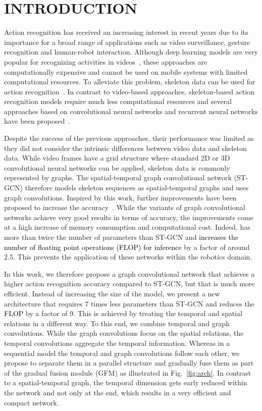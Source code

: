 \documentclass[letterpaper, 10 pt, conference]{ieeeconf}
\newcommand{\todo}[1]{{\textcolor{black}{#1}}}
\begin{document}
\section{INTRODUCTION}
Action recognition has received an increasing interest in recent years due to its importance for a broad range of applications such as video surveillance, gesture recognition and human-robot interaction. Although deep learning models are very popular for recognizing activities in videos~\cite{simonyan2014two, carreira2017quo,li2020ms}, these approaches are computationally expensive and cannot be used on mobile systems with limited computational resources. To alleviate this problem, skeleton data can be used for action recognition~\cite{vemulapalli2014human, fernando2015modeling}. 
In contrast to video-based approaches, skeleton-based action recognition models require much less computational resources and several approaches based on convolutional neural networks and recurrent neural networks have been proposed~\cite{ke2017new, zhang2017view, cao2018skeleton}. 

Despite the success of the previous approaches, their performance was limited as they did not consider the intrinsic differences between video data and skeleton data. While video frames have a grid structure where standard 2D or 3D convolutional neural networks can be applied, skeleton data is commonly represented by graphs. The spatial-temporal graph convolutional network (ST-GCN) \cite{yan2018spatial} therefore models skeleton sequences as spatial-temporal graphs and uses graph convolutions. Inspired by this work, further improvements have been proposed to increase the accuracy~\cite{li2019actional,shi2019two}. While the variants of graph convolutional networks achieve very good results in terms of accuracy, the improvements come at a high increase of memory consumption and computational cost. Indeed, \cite{shi2019two} has more than twice the number of parameters than ST-GCN and \todo{increases the number of floating point operations (FLOP) for inference} by a factor of around 2.5. This prevents the application of these networks within the robotics domain.

In this work, we therefore propose a graph convolutional network that achieves a higher action recognition accuracy compared to ST-GCN, but that is much more efficient. Instead of increasing the size of the model, we present a new architecture that requires 7 times less parameters than ST-GCN and reduces the \todo{FLOP} by a factor of 9. This is achieved by treating the temporal and spatial relations in a different way. To this end, we combine temporal and graph convolutions. While the graph convolutions focus on the spatial relations, the temporal convolutions aggregate the temporal information. Whereas in a sequential model the temporal and graph convolutions follow each other, we propose to separate them in a parallel structure and gradually fuse them as part of the gradual fusion module (GFM) as illustrated in Fig.~\ref{fig:arch}. In contrast to a spatial-temporal graph, the temporal dimension gets early reduced within the network and not only at the end, which results in a very efficient and compact network.     
\end{document}
